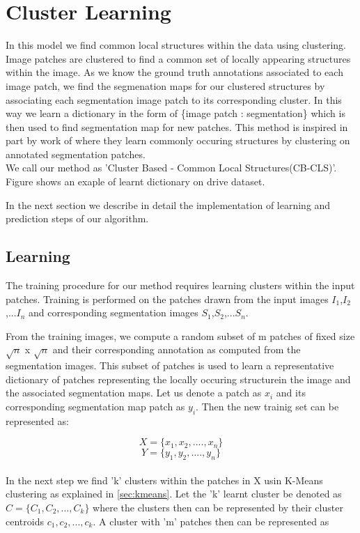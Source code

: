 \section{Cluster Learning}
In this model we find common local structures within the data using clustering. Image patches are clustered to find a common set of locally appearing structures within the image. As we know the ground truth annotations associated to each image patch, we find the segmenation maps for our clustered structures by associating each segmentation image patch to its corresponding cluster. In this way we learn a dictionary in the form of \{image patch : segmentation\} which is then used to find segmentation map for new patches. This method is inspired in part by work of \citep{lim2013sketch} where they learn commonly occuring structures by clustering on annotated segmentation patches.\\
We call our method as 'Cluster Based - Common Local Structures(CB-CLS)'. Figure shows an exaple of learnt dictionary on drive dataset.

In the next section we describe in detail the implementation of learning and prediction steps of our algorithm.

\subsection{Learning}

The training procedure for our method requires learning clusters within the input patches. Training is performed on the patches drawn from the input images $I_1$,$I_2$,...$I_n$ and corresponding segmentation images $S_1$,$S_2$,...$S_n$. 

From the training images, we compute a random subset of m patches of fixed size $\sqrt{n}$ x $\sqrt{n}$ and their corresponding annotation as computed from the segmentation images. This subset of patches is used to learn a representative dictionary of patches representing the locally occuring structurein the image and the associated segmentation maps. Let us denote a patch as $x_i$ and its corresponding segmentation map patch as $y_i$. Then the new trainig set can be represented as:

$$
X = \{x_1,x_2,....,x_n\}
$$
$$
Y = \{y_1,y_2,....,y_n\}
$$
\\
In the next step we find 'k' clusters within the patches in X usin K-Means clustering as explained in \ref{sec:kmeans}. Let the 'k' learnt cluster be denoted as $C = \{C_1,C_2,...,C_k\} $ where the clusters then can be represented by their cluster centroids $c_1, c_2,..., c_k$. A cluster with 'm' patches then can be represented as

